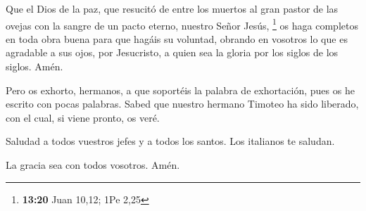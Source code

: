  Que el Dios de la paz, que resucitó de entre los muertos
al gran pastor de las ovejas con la sangre de un pacto eterno, nuestro
Señor Jesús, \footnote{\textbf{13:20} Juan 10,12; 1Pe 2,25}
 os haga completos en toda obra buena para que hagáis su
voluntad, obrando en vosotros lo que es agradable a sus ojos, por
Jesucristo, a quien sea la gloria por los siglos de los siglos. Amén.

 Pero os exhorto, hermanos, a que soportéis la palabra de
exhortación, pues os he escrito con pocas palabras. 
Sabed que nuestro hermano Timoteo ha sido liberado, con el cual, si
viene pronto, os veré.

 Saludad a todos vuestros jefes y a todos los santos. Los
italianos te saludan.

 La gracia sea con todos vosotros. Amén.
